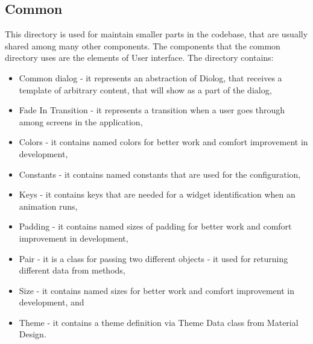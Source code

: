 \subsection{Common}\label{subsec:common}
This directory is used for maintain smaller parts in the codebase, that are usually shared among many other components.
The components that the common directory uses are the elements of User interface.
The directory contains:
\begin{itemize}
    \item Common dialog - it represents an abstraction of Diolog, that receives a template of arbitrary content, that will show as a part of the dialog,
    \item Fade In Transition - it represents a transition when a user goes through among screens in the application,
    \item Colors - it contains named colors for better work and comfort improvement in development,
    \item Constants - it contains named constants that are used for the configuration,
    \item Keys - it contains keys that are needed for a widget identification when an animation runs,
    \item Padding - it contains named sizes of padding for better work and comfort improvement in development,
    \item Pair - it is a class for passing two different objects - it used for returning different data from methods,
    \item Size - it contains named sizes for better work and comfort improvement in development, and
    \item Theme - it contains a theme definition via Theme Data class from Material Design.
\end{itemize}

